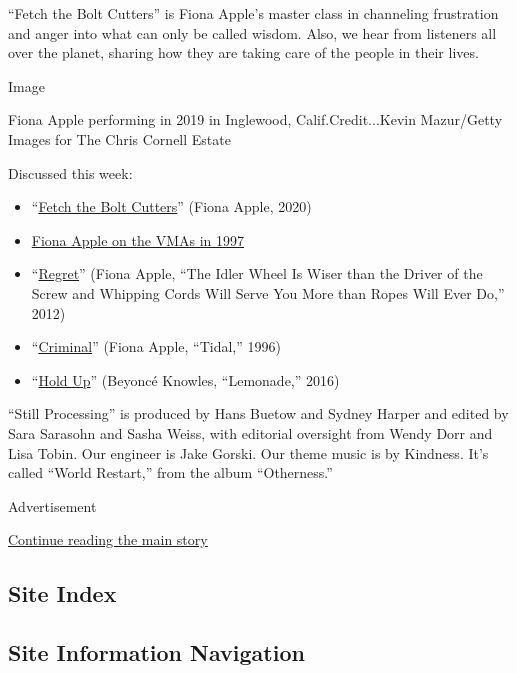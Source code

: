 ``Fetch the Bolt Cutters'' is Fiona Apple's master class in channeling
frustration and anger into what can only be called wisdom. Also, we hear
from listeners all over the planet, sharing how they are taking care of
the people in their lives.

Image

Fiona Apple performing in 2019 in Inglewood, Calif.Credit...Kevin
Mazur/Getty Images for The Chris Cornell Estate

Discussed this week:

\begin{itemize}
\item
  ``\href{https://www.youtube.com/watch?v=N541HLPeG6Y\&list=OLAK5uy_nvvTVXc476e1vHBGAN7Y-DH9_sZjOhgx8}{Fetch
  the Bolt Cutters}'' (Fiona Apple, 2020)
\item
  \href{https://www.youtube.com/watch?v=42gNkySFycA}{Fiona Apple on the
  VMAs in 1997}
\item
  ``\href{https://www.youtube.com/watch?v=9W9Un3rIzns}{Regret}'' (Fiona
  Apple, ``The Idler Wheel Is Wiser than the Driver of the Screw and
  Whipping Cords Will Serve You More than Ropes Will Ever Do,'' 2012)
\item
  ``\href{https://www.youtube.com/watch?v=FFOzayDpWoI}{Criminal}''
  (Fiona Apple, ``Tidal,'' 1996)
\item
  ``\href{https://www.youtube.com/watch?v=PeonBmeFR8o}{Hold Up}''
  (Beyoncé Knowles, ``Lemonade,'' 2016)
\end{itemize}

``Still Processing'' is produced by Hans Buetow and Sydney Harper and
edited by Sara Sarasohn and Sasha Weiss, with editorial oversight from
Wendy Dorr and Lisa Tobin. Our engineer is Jake Gorski. Our theme music
is by Kindness. It's called ``World Restart,'' from the album
``Otherness.''

Advertisement

\protect\hyperlink{after-bottom}{Continue reading the main story}

\hypertarget{site-index}{%
\subsection{Site Index}\label{site-index}}

\hypertarget{site-information-navigation}{%
\subsection{Site Information
Navigation}\label{site-information-navigation}}


